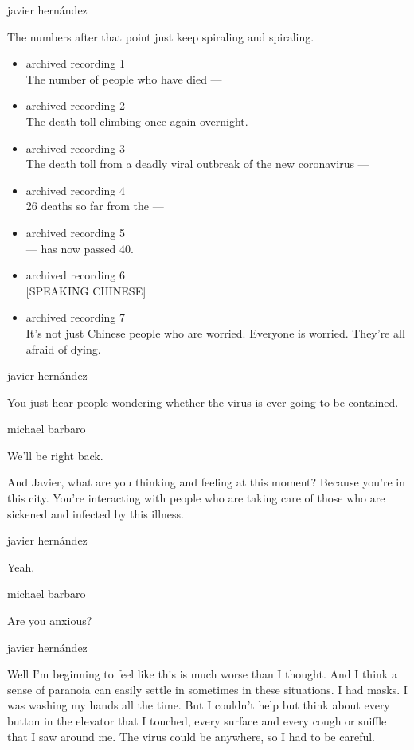 javier hernández

The numbers after that point just keep spiraling and spiraling.

\begin{itemize}
\item
  archived recording 1\\
  The number of people who have died ---
\item
  archived recording 2\\
  The death toll climbing once again overnight.
\item
  archived recording 3\\
  The death toll from a deadly viral outbreak of the new coronavirus ---
\item
  archived recording 4\\
  26 deaths so far from the ---
\item
  archived recording 5\\
  --- has now passed 40.
\item
  archived recording 6\\
  {[}SPEAKING CHINESE{]}
\item
  archived recording 7\\
  It's not just Chinese people who are worried. Everyone is worried.
  They're all afraid of dying.
\end{itemize}

javier hernández

You just hear people wondering whether the virus is ever going to be
contained.

michael barbaro

We'll be right back.

And Javier, what are you thinking and feeling at this moment? Because
you're in this city. You're interacting with people who are taking care
of those who are sickened and infected by this illness.

javier hernández

Yeah.

michael barbaro

Are you anxious?

javier hernández

Well I'm beginning to feel like this is much worse than I thought. And I
think a sense of paranoia can easily settle in sometimes in these
situations. I had masks. I was washing my hands all the time. But I
couldn't help but think about every button in the elevator that I
touched, every surface and every cough or sniffle that I saw around me.
The virus could be anywhere, so I had to be careful.

